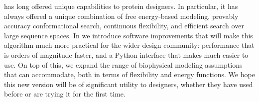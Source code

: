 \osprey has long offered unique capabilities to protein designers.  In particular, it has always offered a unique combination of free energy-based modeling, provably accuracy conformational search, continuous flexibility, and efficient search over large sequence spaces.  In  we introduce software improvements that will make this algorithm much more practical for the wider design community: performance that is orders of magnitude faster, and a Python interface that makes \osprey much easier to use.  On top of this, we expand the range of biophysical modeling assumptions that \osprey can accommodate, both in terms of flexibility and energy functions.  We hope this new version will be of significant utility to designers, whether they have used \osprey before or are trying it for the first time.  

